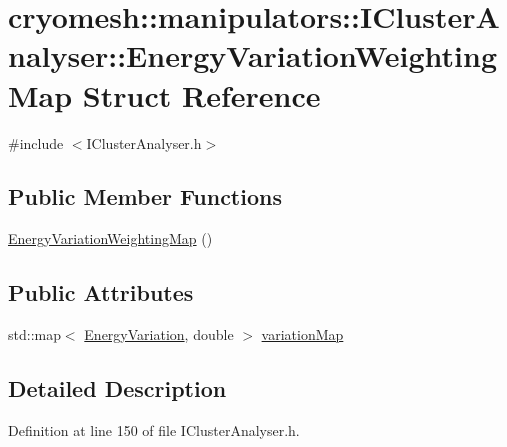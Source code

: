 \hypertarget{structcryomesh_1_1manipulators_1_1IClusterAnalyser_1_1EnergyVariationWeightingMap}{\section{cryomesh\-:\-:manipulators\-:\-:\-I\-Cluster\-Analyser\-:\-:\-Energy\-Variation\-Weighting\-Map \-Struct \-Reference}
\label{structcryomesh_1_1manipulators_1_1IClusterAnalyser_1_1EnergyVariationWeightingMap}
}


{\ttfamily \#include $<$\-I\-Cluster\-Analyser.\-h$>$}

\subsection*{\-Public \-Member \-Functions}
\begin{DoxyCompactItemize}
\item 
\hyperlink{structcryomesh_1_1manipulators_1_1IClusterAnalyser_1_1EnergyVariationWeightingMap_aeb99ace58b34fd7566f0821748ca348f}{\-Energy\-Variation\-Weighting\-Map} ()
\end{DoxyCompactItemize}
\subsection*{\-Public \-Attributes}
\begin{DoxyCompactItemize}
\item 
std\-::map$<$ \hyperlink{classcryomesh_1_1manipulators_1_1IClusterAnalyser_a28a17f8e1363cfb575bacdf213b0781b}{\-Energy\-Variation}, double $>$ \hyperlink{structcryomesh_1_1manipulators_1_1IClusterAnalyser_1_1EnergyVariationWeightingMap_af091e1de3319023e57550338117845af}{variation\-Map}
\end{DoxyCompactItemize}


\subsection{\-Detailed \-Description}


\-Definition at line 150 of file \-I\-Cluster\-Analyser.\-h.



